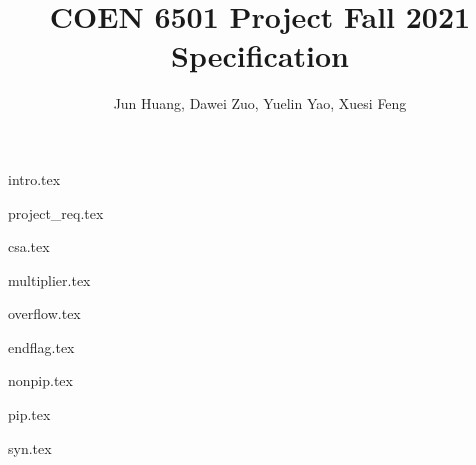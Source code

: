 \documentclass[stu, floatsintext, 10pt, donotrepeattitle, natbib]{apa7}
\title{COEN 6501 Project Fall 2021 Specification}
\author{Jun Huang, Dawei Zuo, Yuelin Yao, Xuesi Feng}
\begin{document}
\maketitle

\renewcommand\contentsname{Table of Conetnts}
\tableofcontents
\setcounter{tocdepth}{5}

\newpage
\renewcommand{\listfigurename}{List of Figures}
\listoffigures
\newpage
\renewcommand{\listtablename}{List of Tables}
\listoftables


\newpage
{intro.tex}

\newpage
{project_req.tex}

\newpage
{csa.tex}

\newpage
{multiplier.tex}

\newpage
{overflow.tex}

\newpage
{endflag.tex}

\newpage
{nonpip.tex}

\newpage
{pip.tex}

\newpage
{syn.tex}

\newpage
\renewcommand\refname{\textbf{References}}

\end{document}
